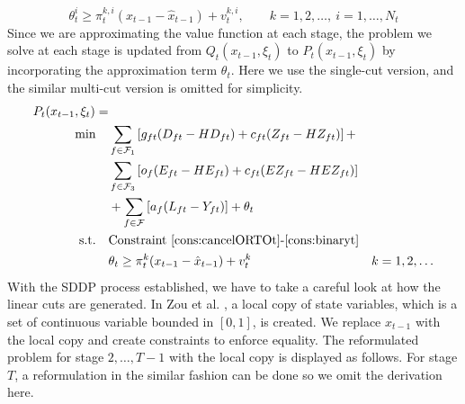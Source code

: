 \documentclass[12pt]{article}
\begin{document}
	\begin{equation}
		\theta_t^i \geq \pi_t^{k,i}(x_{t-1} - \hat{x}_{t-1}) + v_t^{k,i}, \qquad k = 1, 2, \dots,\ i = 1, \dots, N_t
	\end{equation}
	Since we are approximating the value function at each stage, the problem we solve at each stage is updated from \(Q_t(x_{t-1},\xi_t)\) to \(P_t(x_{t - 1}, \xi_t)\) by incorporating the approximation term \(\theta_t\). Here we use the single-cut version, and the similar multi-cut version is omitted for simplicity.
	\begin{subequations}
		\begin{align}
			P_t(x_{t-1},\xi_t) = & & \\
			\min \quad & \sum_{f \in \mathcal{F}_1} \left[ g_{ft} (D_{ft} - HD_{ft}) + c_{ft} (Z_{ft} - HZ_{ft}) \right]  + & \nonumber \\
			& \sum_{f \in \mathcal{F}_3} \left[ o_f(E_{ft} - HE_{ft}) + c_{ft}(EZ_{ft} - HEZ_{ft}) \right]& \nonumber\\ 
			& +\sum_{f \in \mathcal{F}} \left[ a_f (L_{ft} - Y_{ft})\right]  + \theta_t &\\
			\text{s.t.} \quad & \text{Constraint \eqref{cons:cancelORTOt}-\eqref{cons:binaryt}} & \\
			& \theta_t \geq \pi_t^k(x_{t-1} - \hat{x}_{t-1}) + v_t^k & k = 1, 2, \dots
		\end{align}
	\end{subequations}
	\noindent With the SDDP process established, we have to take a careful look at how the linear cuts are generated. In Zou et al. \cite{zou2016nested}, a local copy of state variables, which is a set of continuous variable bounded in \([0,1]\), is created. We replace \(x_{t-1}\) with the local copy and create constraints to enforce equality. The reformulated problem for stage \(2, \dots, T-1\) with the local copy is displayed as follows. For stage \(T\), a reformulation in the similar fashion can be done so we omit the derivation here.
\end{document}

